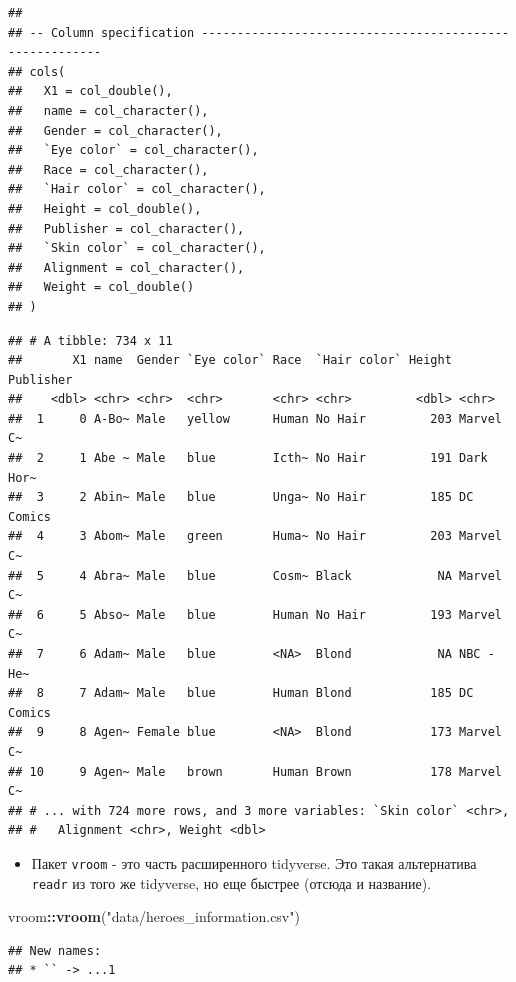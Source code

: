 \documentclass[
]{book}
\newenvironment{Shaded}{\begin{snugshade}}{\end{snugshade}}
\newcommand{\KeywordTok}[1]{\textcolor[rgb]{0.13,0.29,0.53}{\textbf{#1}}}
\newcommand{\NormalTok}[1]{#1}
\newcommand{\OperatorTok}[1]{\textcolor[rgb]{0.81,0.36,0.00}{\textbf{#1}}}
\newcommand{\StringTok}[1]{\textcolor[rgb]{0.31,0.60,0.02}{#1}}
\providecommand{\tightlist}{%
  \setlength{\itemsep}{0pt}\setlength{\parskip}{0pt}}
\begin{document}
\begin{verbatim}
## 
## -- Column specification --------------------------------------------------------
## cols(
##   X1 = col_double(),
##   name = col_character(),
##   Gender = col_character(),
##   `Eye color` = col_character(),
##   Race = col_character(),
##   `Hair color` = col_character(),
##   Height = col_double(),
##   Publisher = col_character(),
##   `Skin color` = col_character(),
##   Alignment = col_character(),
##   Weight = col_double()
## )
\end{verbatim}

\begin{verbatim}
## # A tibble: 734 x 11
##       X1 name  Gender `Eye color` Race  `Hair color` Height Publisher
##    <dbl> <chr> <chr>  <chr>       <chr> <chr>         <dbl> <chr>    
##  1     0 A-Bo~ Male   yellow      Human No Hair         203 Marvel C~
##  2     1 Abe ~ Male   blue        Icth~ No Hair         191 Dark Hor~
##  3     2 Abin~ Male   blue        Unga~ No Hair         185 DC Comics
##  4     3 Abom~ Male   green       Huma~ No Hair         203 Marvel C~
##  5     4 Abra~ Male   blue        Cosm~ Black            NA Marvel C~
##  6     5 Abso~ Male   blue        Human No Hair         193 Marvel C~
##  7     6 Adam~ Male   blue        <NA>  Blond            NA NBC - He~
##  8     7 Adam~ Male   blue        Human Blond           185 DC Comics
##  9     8 Agen~ Female blue        <NA>  Blond           173 Marvel C~
## 10     9 Agen~ Male   brown       Human Brown           178 Marvel C~
## # ... with 724 more rows, and 3 more variables: `Skin color` <chr>,
## #   Alignment <chr>, Weight <dbl>
\end{verbatim}

\begin{itemize}
\tightlist
\item
  Пакет \texttt{vroom} - это часть расширенного tidyverse. Это такая альтернатива \texttt{readr} из того же tidyverse, но еще быстрее (отсюда и название).
\end{itemize}

\begin{Shaded}
\begin{Highlighting}[]
\NormalTok{vroom}\OperatorTok{::}\KeywordTok{vroom}\NormalTok{(}\StringTok{"data/heroes_information.csv"}\NormalTok{)}
\end{Highlighting}
\end{Shaded}

\begin{verbatim}
## New names:
## * `` -> ...1
\end{verbatim}
\end{document}
